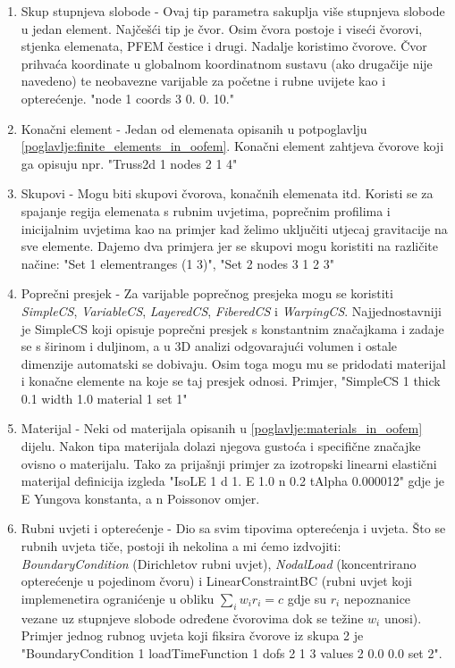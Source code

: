 \documentclass[a4paper,twoside,12pt]{memoir} %
\begin{document}
\begin{enumerate}
\begin{enumerate}
        \item Skup stupnjeva slobode - Ovaj tip parametra sakuplja više stupnjeva slobode u jedan element. Najčešći tip je čvor. Osim čvora postoje i viseći čvorovi, stjenka elemenata, PFEM čestice i drugi. Nadalje koristimo čvorove. Čvor prihvaća koordinate u globalnom koordinatnom sustavu (ako drugačije nije navedeno) te neobavezne varijable za početne i rubne uvijete kao i opterećenje. "node 1 coords 3 0.  0. 10."
        \item Konačni element - Jedan od elemenata opisanih u potpoglavlju \ref{poglavlje:finite_elements_in_oofem}. Konačni element zahtjeva čvorove koji ga opisuju npr. "Truss2d 1 nodes 2 1 4"
        \item Skupovi - Mogu biti skupovi čvorova, konačnih elemenata itd. Koristi se za spajanje regija elemenata s rubnim uvjetima, poprečnim profilima i inicijalnim uvjetima kao na primjer kad želimo uključiti utjecaj gravitacije na sve elemente. Dajemo dva primjera jer se skupovi mogu koristiti na različite načine: "Set 1 elementranges {(1 3)}", "Set 2 nodes 3 1 2 3"  
        \item Poprečni presjek - Za varijable poprečnog presjeka mogu se koristiti \textit{SimpleCS}, \textit{VariableCS}, \textit{LayeredCS}, \textit{FiberedCS} i \textit{WarpingCS}. Najjednostavniji je SimpleCS koji opisuje poprečni presjek s konstantnim značajkama i zadaje se s širinom i duljinom, a u 3D analizi odgovarajući volumen i ostale dimenzije automatski se dobivaju. Osim toga mogu mu se pridodati materijal i konačne elemente na koje se taj presjek odnosi. Primjer, "SimpleCS 1 thick 0.1 width 1.0 material 1 set 1"
        \item Materijal - Neki od materijala opisanih u \ref{poglavlje:materials_in_oofem} dijelu. Nakon tipa materijala dolazi njegova gustoća i specifične značajke ovisno o materijalu. Tako za prijašnji primjer za izotropski linearni elastični materijal  definicija izgleda "IsoLE 1 d 1. E 1.0 n 0.2  tAlpha 0.000012" gdje je E Yungova konstanta, a n Poissonov omjer.
        \item Rubni uvjeti i opterećenje - Dio sa svim tipovima opterećenja i uvjeta. Što se rubnih uvjeta tiče, postoji ih nekolina a mi ćemo izdvojiti: \textit{BoundaryCondition} (Dirichletov rubni uvjet), \textit{NodalLoad} (koncentrirano opterećenje u pojedinom čvoru) i LinearConstraintBC (rubni uvjet koji implemenetira ogranićenje u obliku $\sum_i w_i r_i = c$ gdje su $r_i$ nepoznanice vezane uz stupnjeve slobode određene čvorovima dok se težine $w_i$ unosi). Primjer jednog rubnog uvjeta koji fiksira čvorove iz skupa 2 je "BoundaryCondition 1 loadTimeFunction 1 dofs 2 1 3 values 2 0.0 0.0 set 2". 

\end{enumerate}
\end{enumerate}
\end{document}
